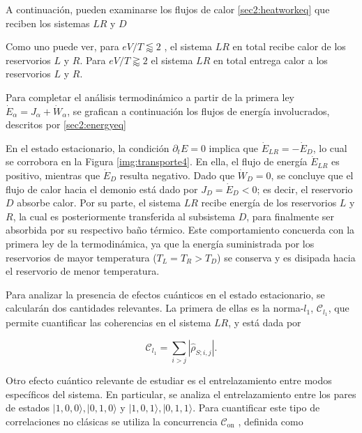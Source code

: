 A continuación, pueden examinarse los flujos de calor \ref{sec2:heatworkeq} que reciben los sistemas $LR$ y $D$

    
Como uno puede ver, para $eV/T \lessapprox 2$ , el sistema $LR$ en total recibe calor de los reservorios $L$ y $R$. Para $eV/T \gtrapprox 2$ el sistema $LR$ en total entrega calor a los reservorios $L$ y $R$. 

Para completar el análisis termodinámico a partir de la primera ley $\dot{E}_{\alpha} = J_{\alpha} + \dot{W}_{\alpha}$, se grafican a continuación los flujos de energía involucrados, descritos por \ref{sec2:energyeq}


En el estado estacionario, la condición \( \partial_t E = 0 \) implica que \( \dot{E}_{LR} = -\dot{E}_D \), lo cual se corrobora en la Figura \ref{img:transporte4}. En ella, el flujo de energía \( \dot{E}_{LR} \) es positivo, mientras que \( \dot{E}_D \) resulta negativo. Dado que \( \dot{W}_{D} = 0 \), se concluye que el flujo de calor hacia el demonio está dado por \( J_D = \dot{E}_D < 0 \); es decir, el reservorio \( D \) absorbe calor. Por su parte, el sistema \( LR \) recibe energía de los reservorios \( L \) y \( R \), la cual es posteriormente transferida al subsistema \( D \), para finalmente ser absorbida por su respectivo baño térmico. Este comportamiento concuerda con la primera ley de la termodinámica, ya que la energía suministrada por los reservorios de mayor temperatura (\( T_L = T_R > T_D \)) se conserva y es disipada hacia el reservorio de menor temperatura.

Para analizar la presencia de efectos cuánticos en el estado estacionario, se calcularán dos cantidades relevantes. La primera de ellas es la norma-\( l_{1} \), \( \mathcal{C}_{l_{1}} \), que permite cuantificar las coherencias en el sistema \( LR \), y está dada por


\begin{equation*}
    \mathcal{C}_{l_{1}} = \sum_{i> j} |\hat{\rho}_{S;i,j}|.
\end{equation*}

Otro efecto cuántico relevante de estudiar es el entrelazamiento entre modos específicos del sistema. En particular, se analiza el entrelazamiento entre los pares de estados \(|1,0,0\rangle, |0,1,0\rangle\) y \(|1,0,1\rangle, |0,1,1\rangle\). Para cuantificar este tipo de correlaciones no clásicas se utiliza la concurrencia \( \mathcal{C}_{\text{on}} \) \cite{hill1997entanglement, wootters1998entanglement}, definida como

